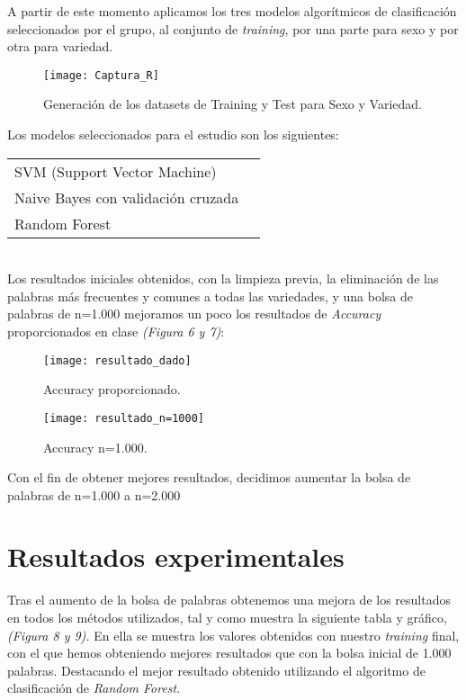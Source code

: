 \documentclass[11pt,a4paper]{article}
\begin{document}
A partir de este momento aplicamos los tres modelos algorítmicos de clasificación seleccionados por el grupo, al conjunto de {\em training}, por una parte para sexo y por otra para variedad.

\begin{figure}[htb]
\centering
\texttt{[image: Captura\_R]}
\caption{Generación de los datasets de Training y Test para Sexo y Variedad.} \label{fig:Captura_R}
\end{figure}

Los modelos seleccionados para el estudio son los siguientes:

\begin{tabular}{ l c }
  SVM (Support Vector Machine) \\
  Naive Bayes con validación cruzada \\
  Random Forest \\
\end{tabular}\\

Los resultados iniciales obtenidos, con la limpieza previa, la eliminación de las palabras más frecuentes y comunes a todas las variedades, y una bolsa de palabras de n=1.000 mejoramos un poco los resultados de {\em Accuracy} proporcionados en clase {\em(Figura 6 y 7)}:

\begin{figure}[htb]
\centering
\texttt{[image: resultado\_dado]}
\caption{Accuracy proporcionado.} \label{fig:resultado_dado}
\end{figure}

\begin{figure}[htb]
\centering
\texttt{[image: resultado\_n=1000]}
\caption{Accuracy n=1.000.} \label{fig:resultado_n=1000}
\end{figure}

 Con el fin de obtener mejores resultados, decidimos aumentar la bolsa de palabras de n=1.000 a n=2.000


\section{Resultados experimentales}

Tras el aumento de la bolsa de palabras obtenemos una mejora de los resultados en todos los métodos utilizados, tal y como muestra la siguiente tabla y gráfico,{\em (Figura 8 y 9).}
En ella se muestra los valores obtenidos con nuestro {\em training} final, con el que hemos obteniendo mejores resultados que con la bolsa inicial de 1.000 palabras. Destacando el mejor resultado obtenido utilizando el algoritmo de clasificación de {\em Random Forest}.
\end{document}
